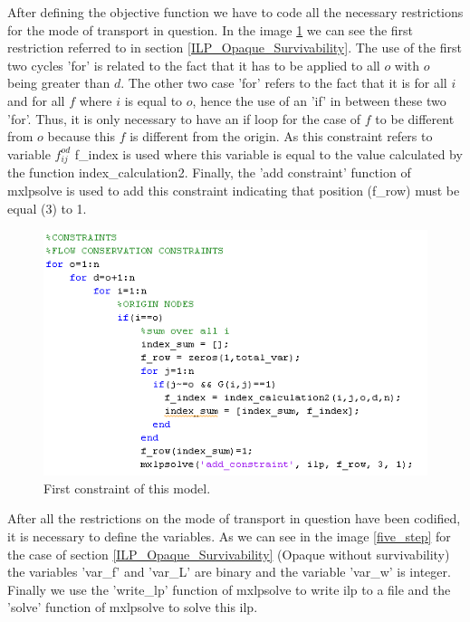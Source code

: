 \vspace{13pt}
After defining the objective function we have to code all the necessary restrictions for the mode of transport in question. In the image \ref{four_step} we can see the first restriction referred to in section \ref{ILP_Opaque_Survivability}.
The use of the first two cycles 'for' is related to the fact that it has to be applied to all $o$ with $o$ being greater than $d$. The other two case 'for' refers to the fact that it is for all $i$ and for all $f$ where $i$ is equal to $o$, hence the use of an 'if' in between these two 'for'. Thus, it is only necessary to have an if loop for the case of $f$ to be different from $o$ because this $f$ is different from the origin. As this constraint refers to variable $f_{ij}^{od}$ f\_index is used where this variable is equal to the value calculated by the function index\_calculation2. Finally, the 'add constraint' function of mxlpsolve is used to add this constraint indicating that position (f\_row) must be equal (3) to 1.\\

\begin{figure}[h!]
\centering
\includegraphics[width=\textwidth]{appendices/lpsolve/figures/four_step}
\caption{First constraint of this model.}
\label{four_step}
\end{figure}

\vspace{13pt}
After all the restrictions on the mode of transport in question have been codified, it is necessary to define the variables. As we can see in the image \ref{five_step} for the case of section \ref{ILP_Opaque_Survivability} (Opaque without survivability) the variables 'var\_f' and 'var\_L' are binary and the variable 'var\_w' is integer. Finally we use the 'write\_lp' function of mxlpsolve to write ilp to a file and the 'solve' function of mxlpsolve to solve this ilp.\\

